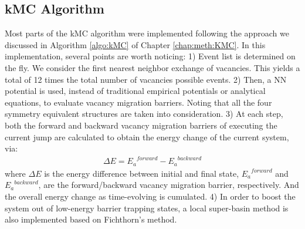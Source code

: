 \subsection{\acf{kMC} Algorithm}
Most parts of the \ac{kMC} algorithm were implemented following the approach we discussed in Algorithm \ref{algo:kMC} of Chapter \ref{chap:meth:KMC}. In this implementation, several points are worth noticing: 1) Event list is determined on the fly. We consider the first nearest neighbor exchange of vacancies. This yields a total of 12 times the total number of vacancies possible events. 2) Then, a \ac{NN} potential is used, instead of traditional empirical potentials or analytical equations, to evaluate vacancy migration barriers. Noting that all the four symmetry equivalent structures are taken into consideration. 3) At each step, both the forward and backward vacancy migration barriers of executing the current jump are calculated to obtain the energy change of the current system, via:
\begin{align}
\Delta E = {E_a}^{forward} - {E_a}^{backward}
\label{Chap:Al/Vac:eq:barrier-EDiff}
\end{align}
where $\Delta E$ is the energy difference between initial and final state, ${E_a}^{forward}$ and ${E_a}^{backward}$, are the forward/backward vacancy migration barrier, respectively. And the overall energy change as time-evolving is cumulated. 4) In order to boost the system out of low-energy barrier trapping states, a local super-basin method is also implemented based on Fichthorn's method\cite{fichthorn2013local}.


